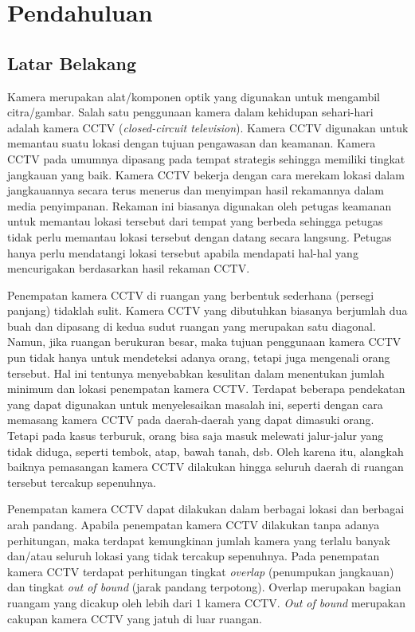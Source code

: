 \chapter{Pendahuluan}
\label{chap:intro}
   
\section{Latar Belakang}
\label{sec:label}

Kamera merupakan alat/komponen optik yang digunakan untuk mengambil citra/gambar. Salah satu penggunaan kamera dalam kehidupan sehari-hari adalah kamera CCTV (\textit{closed-circuit television}). Kamera CCTV digunakan untuk memantau suatu lokasi dengan tujuan pengawasan dan keamanan. Kamera CCTV pada umumnya dipasang pada tempat strategis sehingga memiliki tingkat jangkauan yang baik. Kamera CCTV bekerja dengan cara merekam lokasi dalam jangkauannya secara terus menerus dan menyimpan hasil rekamannya dalam media penyimpanan. Rekaman ini biasanya digunakan oleh petugas keamanan untuk memantau lokasi tersebut dari tempat yang berbeda sehingga petugas tidak perlu memantau lokasi tersebut dengan datang secara langsung. Petugas hanya perlu mendatangi lokasi tersebut apabila mendapati hal-hal yang mencurigakan berdasarkan hasil rekaman CCTV.

Penempatan kamera CCTV di ruangan yang berbentuk sederhana (persegi panjang) tidaklah sulit. Kamera CCTV yang dibutuhkan biasanya berjumlah dua buah dan dipasang di kedua sudut ruangan yang merupakan satu diagonal. Namun, jika ruangan berukuran besar, maka tujuan penggunaan kamera CCTV pun tidak hanya untuk mendeteksi adanya orang, tetapi juga mengenali orang tersebut. Hal ini tentunya menyebabkan kesulitan dalam menentukan jumlah minimum dan lokasi penempatan kamera CCTV. Terdapat beberapa pendekatan yang dapat digunakan untuk menyelesaikan masalah ini, seperti dengan cara memasang kamera CCTV pada daerah-daerah yang dapat dimasuki orang. Tetapi pada kasus terburuk, orang bisa saja masuk melewati jalur-jalur yang tidak diduga, seperti tembok, atap, bawah tanah, dsb. Oleh karena itu, alangkah baiknya pemasangan kamera CCTV dilakukan hingga seluruh daerah di ruangan tersebut tercakup sepenuhnya.

Penempatan kamera CCTV dapat dilakukan dalam berbagai lokasi dan berbagai arah pandang. Apabila penempatan kamera CCTV dilakukan tanpa adanya perhitungan, maka terdapat kemungkinan jumlah kamera yang terlalu banyak dan/atau seluruh lokasi yang tidak tercakup sepenuhnya. Pada penempatan kamera CCTV terdapat perhitungan tingkat \textit{overlap} (penumpukan jangkauan) dan tingkat \textit{out of bound} (jarak pandang terpotong). Overlap merupakan bagian ruangam yang dicakup oleh lebih dari 1 kamera CCTV. \textit{Out of bound} merupakan cakupan kamera CCTV yang jatuh di luar ruangan.

